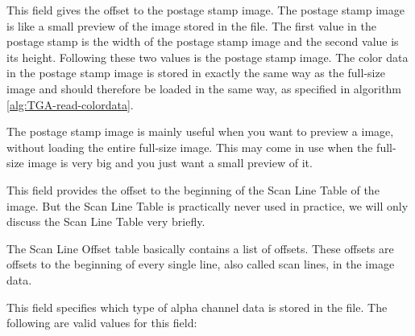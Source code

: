 
This field gives the offset to the postage stamp image. The postage
stamp image is like a small preview of the image stored in the
file. The first value in the postage stamp is the width of the postage
stamp image and the second value is its height. Following these two
values is the postage stamp image. The color data in the postage stamp
image is stored in exactly the same way as the full-size image and
should therefore be loaded in the same way, as specified in algorithm
\ref{alg:TGA-read-colordata}.

The postage stamp image is mainly useful when you want to preview a
\tga image, without loading the entire full-size image. This may come
in use when the full-size image is very big and you just want a small
preview of it.


This field provides the offset to the beginning of the Scan Line Table
of the image. But the Scan Line Table is practically never used in
practice, we will only discuss the Scan Line Table very briefly.

The Scan Line Offset table basically contains a list of offsets. These
offsets are offsets to the beginning of every single line, also called
scan lines, in the image data.


This field specifies which type of alpha channel data is stored in the
file. The following are valid values for this field:


